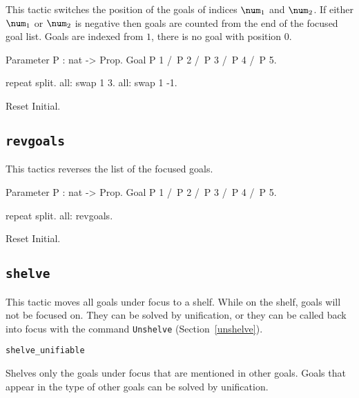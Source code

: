 \begin{coq_example*}
This tactic switches the position of the goals of indices $\num_1$ and $\num_2$. If either $\num_1$ or $\num_2$ is negative then goals are counted from the end of the focused goal list. Goals are indexed from $1$, there is no goal with position $0$. 

\Example
\begin{coq_example*}
Parameter P : nat -> Prop.
Goal P 1 /\ P 2 /\ P 3 /\ P 4 /\ P 5.
\end{coq_example*}
\begin{coq_example}
repeat split.
all: swap 1 3.
all: swap 1 -1.
\end{coq_example}

\begin{coq_eval}
Reset Initial.
\end{coq_eval}

\subsection[\tt revgoals]{\tt revgoals}

This tactics reverses the list of the focused goals.

\Example
\begin{coq_example*}
Parameter P : nat -> Prop.
Goal P 1 /\ P 2 /\ P 3 /\ P 4 /\ P 5.
\end{coq_example*}
\begin{coq_example}
repeat split.
all: revgoals.
\end{coq_example}

\begin{coq_eval}
Reset Initial.
\end{coq_eval}



\subsection[\tt shelve]{\tt shelve\label{shelve}}

This tactic moves all goals under focus to a shelf. While on the shelf, goals
will not be focused on. They can be solved by unification, or they can be called
back into focus with the command {\tt Unshelve} (Section~\ref{unshelve}).

\begin{Variants}
  \item \texttt{shelve\_unifiable}

    Shelves only the goals under focus that are mentioned in other goals.
    Goals that appear in the type of other goals can be solved by unification.


\end{Variants}
\end{coq_example*}
